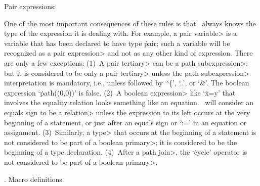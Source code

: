 \Bigbreak
\noindent Pair expressions:

  One of the most important consequences of these rules is that \MF\
always knows the type of the expression it is dealing with. For example,
a \<pair variable> is a variable that has been declared to have type
\.{pair}; such a variable will be recognized as a \<pair expression>
and not as any other kind of expression. There are only a few exceptions:
(1)~A \<pair tertiary> can be a \<path subexpression>; but it
is considered to be only a \<pair tertiary> unless the \<path
subexpression> interpretation is mandatory, i.e., unless followed by
`\.{\char`\{}', `\.{..}', or `\.{\&}'. The boolean expression `\.{path((0,0))}'
is false.  (2)~A \<boolean expression> like `\.{x=y}' that involves the
equality relation looks something like an equation. \MF\ will consider an
equals sign to be a \<relation> unless the expression to its left occurs
at the very beginning of a statement, or just after an equals sign
or `\.{:=}' in an equation or assignment.
(3)~Similarly, a \<type> that occurs at the beginning of a statement
is not considered to be part of a \<boolean primary>; it is considered to
be the beginning of a type declaration.
(4)~After a \<path join>, the `\.{cycle}' operator is not considered
to be part of a \<boolean primary>.

. Macro definitions.

